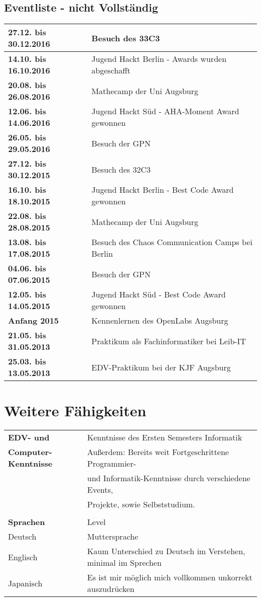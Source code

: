 \documentclass{scrartcl}
\begin{document}
\subsection*{Eventliste - nicht Vollständig}
\begin{tabular}{|l|l|}
    \hline

    \textbf{27.12. bis 30.12.2016} & Besuch des 33C3 \\ \hline
    \textbf{14.10. bis 16.10.2016} & Jugend Hackt Berlin - Awards wurden abgeschafft \\ \hline
    \textbf{20.08. bis 26.08.2016} & Mathecamp der Uni Augsburg \\ \hline
    \textbf{12.06. bis 14.06.2016} & Jugend Hackt Süd - AHA-Moment Award gewonnen \\ \hline
    \textbf{26.05. bis 29.05.2016} & Besuch der GPN \\ \hline
    \textbf{27.12. bis 30.12.2015} & Besuch des 32C3 \\ \hline
    \textbf{16.10. bis 18.10.2015} & Jugend Hackt Berlin - Best Code Award gewonnen \\ \hline
    \textbf{22.08. bis 28.08.2015} & Mathecamp der Uni Augsburg \\ \hline
    \textbf{13.08. bis 17.08.2015} & Besuch des Chaos Communication Camps bei Berlin \\ \hline
    \textbf{04.06. bis 07.06.2015} & Besuch der GPN \\ \hline
    \textbf{12.05. bis 14.05.2015} & Jugend Hackt Süd - Best Code Award gewonnen \\ \hline
    \textbf{Anfang 2015          } & Kennenlernen des OpenLabs Augsburg \\ \hline
    \textbf{21.05. bis 31.05.2013} & Praktikum als Fachinformatiker bei Leib-IT \\ \hline
    \textbf{25.03. bis 13.05.2013} & EDV-Praktikum bei der KJF Augsburg \\ \hline

\end{tabular}

\section*{Weitere Fähigkeiten}
\begin{tabular}{|l|l|}
    \hline
    \textbf{EDV- und} & Kenntnisse des Ersten Semesters Informatik \\
    \textbf{Computer-Kenntnisse} & Außerdem: Bereits weit Fortgeschrittene Programmier- \\
    & und Informatik-Kenntnisse durch verschiedene Events, \\
    & Projekte, sowie Selbststudium. \\ \hline
    \\ \hline
    \textbf{Sprachen} & Level \\ \hline
    Deutsch & Muttersprache \\ \hline
    Englisch & Kaum Unterschied zu Deutsch im Verstehen, minimal im Sprechen \\ \hline
    Japanisch & Es ist mir möglich mich vollkommen unkorrekt auszudrücken \\ \hline

\end{tabular}
\end{document}
